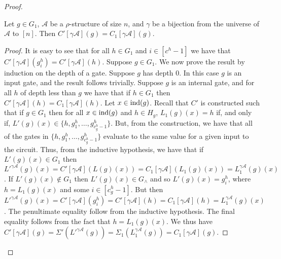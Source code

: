 \documentclass[../paper.tex]{subfiles}
\begin{document}
\begin{proof}
  \begin{claim}
    Let $g \in G_1$, $\mathcal{A}$ be a $\rho$-structure of size $n$, and
    $\gamma$ be a bijection from the universe of $\mathcal{A}$ to $[n]$. Then
    $C'[\gamma \mathcal{A}](g) = C_1[\gamma \mathcal{A}](g)$.
  \end{claim}
  \begin{proof}
    It is easy to see that for all $h \in G_1$ and $i \in [c^h-1]$ we have that
    $C'[\gamma \mathcal{A}](g^h_i) = C'[\gamma \mathcal{A}](h)$. Suppose $g \in
    G_1$. We now prove the result by induction on the depth of a gate. Suppose
    $g$ has depth $0$. In this case $g$ is an input gate, and the result follows
    trivially. Suppose $g$ is an internal gate, and for all $h$ of depth less
    than $g$ we have that if $h \in G_1$ then $C'[\gamma \mathcal{A}](h) =
    C_1[\gamma \mathcal{A}](h)$. Let $x \in \text{\upshape ind}(g)$. Recall that $C'$ is
    constructed such that if $g \in G_1$ then for all $x \in \text{\upshape ind}(g)$ and $h \in
    H_g$, $L_1(g)(x) = h$ if, and only if, $L'(g)(x) \in \{h, g^h_1, \ldots ,
    g^h_{c^h_g - 1}\}$. But, from the construction, we have that all of the
    gates in $\{h, g^h_1, \ldots, g^h_{c^h_g -1}\}$ evaluate to the same value
    for a given input to the circuit. Thus, from the inductive hypothesis, we
    have that if $L'(g)(x) \in G_1$ then $ {L'}^{\gamma \mathcal{A}}(g)(x) =
    C'[\gamma \mathcal{A}](L(g)(x)) = C_1[\gamma \mathcal{A}](L_1(g)(x)) =
    L^{\gamma \mathcal{A}}_1(g)(x) $. If $L'(g)(x) \not\in G_1$ then $L'(g)(x)
    \in G_{\land}$ and so $L'(g)(x) = g^h_i$, where $h = L_1(g)(x)$ and some $i
    \in [c^h_g -1]$. But then ${L'}^{\gamma \mathcal{A}}(g)(x) = C'[\gamma
    \mathcal{A}](g^h_i) = C'[\gamma \mathcal{A}](h) = C_1[\gamma \mathcal{A}](h)
    = L^{\gamma \mathcal{A}}_1(g)(x)$. The penultimate equality follow from 
    the inductive hypothesis. The final equality follows from the fact that $h =
    L_1 (g)(x)$. We thus have $C'[\gamma \mathcal{A}](g) = \Sigma'({L'}^{\gamma
      \mathcal{A}}(g)) = \Sigma_1 (L^{\gamma \mathcal{A}}_1(g)) = C_1[\gamma
    \mathcal{A}](g)$.
  \end{proof}


\end{proof}
\end{document}
